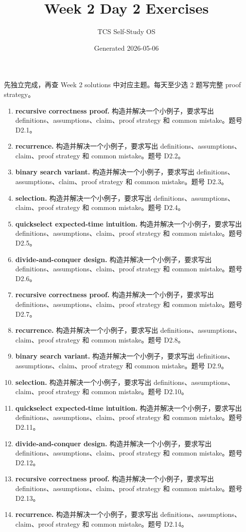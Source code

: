 \documentclass[11pt]{ctexart}
\title{Week 2 Day 2 Exercises}
\author{TCS Self-Study OS}
\date{Generated 2026-05-06}
\begin{document}
\maketitle
先独立完成，再查 Week 2 solutions 中对应主题。每天至少选 2 题写完整 proof strategy。
\begin{enumerate}
  \item \textbf{recursive correctness proof.} 构造并解决一个小例子，要求写出 definitions、assumptions、claim、proof strategy 和 common mistake。题号 D2.1。
  \item \textbf{recurrence.} 构造并解决一个小例子，要求写出 definitions、assumptions、claim、proof strategy 和 common mistake。题号 D2.2。
  \item \textbf{binary search variant.} 构造并解决一个小例子，要求写出 definitions、assumptions、claim、proof strategy 和 common mistake。题号 D2.3。
  \item \textbf{selection.} 构造并解决一个小例子，要求写出 definitions、assumptions、claim、proof strategy 和 common mistake。题号 D2.4。
  \item \textbf{quickselect expected-time intuition.} 构造并解决一个小例子，要求写出 definitions、assumptions、claim、proof strategy 和 common mistake。题号 D2.5。
  \item \textbf{divide-and-conquer design.} 构造并解决一个小例子，要求写出 definitions、assumptions、claim、proof strategy 和 common mistake。题号 D2.6。
  \item \textbf{recursive correctness proof.} 构造并解决一个小例子，要求写出 definitions、assumptions、claim、proof strategy 和 common mistake。题号 D2.7。
  \item \textbf{recurrence.} 构造并解决一个小例子，要求写出 definitions、assumptions、claim、proof strategy 和 common mistake。题号 D2.8。
  \item \textbf{binary search variant.} 构造并解决一个小例子，要求写出 definitions、assumptions、claim、proof strategy 和 common mistake。题号 D2.9。
  \item \textbf{selection.} 构造并解决一个小例子，要求写出 definitions、assumptions、claim、proof strategy 和 common mistake。题号 D2.10。
  \item \textbf{quickselect expected-time intuition.} 构造并解决一个小例子，要求写出 definitions、assumptions、claim、proof strategy 和 common mistake。题号 D2.11。
  \item \textbf{divide-and-conquer design.} 构造并解决一个小例子，要求写出 definitions、assumptions、claim、proof strategy 和 common mistake。题号 D2.12。
  \item \textbf{recursive correctness proof.} 构造并解决一个小例子，要求写出 definitions、assumptions、claim、proof strategy 和 common mistake。题号 D2.13。
  \item \textbf{recurrence.} 构造并解决一个小例子，要求写出 definitions、assumptions、claim、proof strategy 和 common mistake。题号 D2.14。
\end{enumerate}
\end{document}

